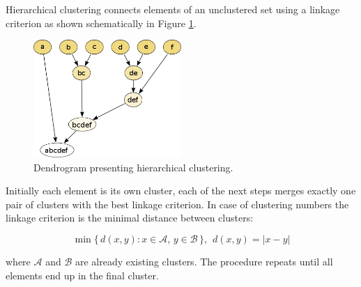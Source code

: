 
Hierarchical clustering connects elements of an unclustered set using a linkage criterion
as shown schematically in Figure \ref{fig:dendrogram}.
\begin{figure}[htbp]
\centering
\includegraphics[width=0.5\textwidth]{plots/dendrogram.png}
\caption{Dendrogram presenting hierarchical clustering. \label{fig:dendrogram}}
\end{figure}

 Initially each element is its own cluster, each of the next steps merges exactly one pair of clusters 
with the best linkage criterion. In case of clustering numbers the linkage criterion is the minimal distance 
between clusters:

\[
\min \{\, d(x,y) : x \in \mathcal{A},\, y \in \mathcal{B} \,\}, \hspace{5pt} d(x,y)=|x-y| 
\]   

where $\mathcal{A}$ and $\mathcal{B}$ are already existing clusters. The procedure repeats until all elements end up
in the final cluster.   
